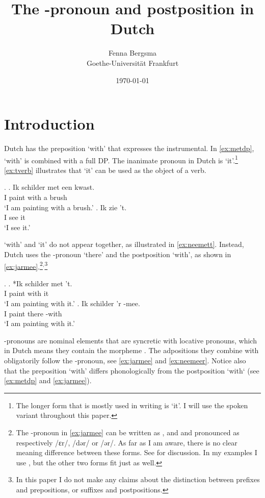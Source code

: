 \documentclass[12pt]{article}
\title{The \tsc{r}-pronoun and postposition \tit{waar-mee} in Dutch}
\author{Fenna Bergsma\\Goethe-Universität Frankfurt}
\date{\today}
\begin{document}
\maketitle


\section{Introduction}

Dutch has the preposition  `with' that expresses the instrumental. In \ref{ex:metdp},  `with' is combined with a full DP. The inanimate pronoun in Dutch is  `it'.\footnote{The longer form that is mostly used in writing is  `it'. I will use the spoken variant  throughout this paper.} \ref{ex:tverb} illustrates that  `it' can be used as the object of a verb.

\ex.
\ag. Ik schilder met een kwast.\\
 I paint with a brush\\
 `I am painting with a brush.'\label{ex:metdp}
 \bg. Ik zie 't.\\
  I see it\\
  `I see it.'\label{ex:tverb}

 `with' and  `it' do not appear together, as illustrated in \ref{ex:neemett}. Instead, Dutch uses the -pronoun  `there' and the postposition  `with', as shown in \ref{ex:jarmee}.\footnote{The -pronoun  in \ref{ex:jarmee} can be written as ,  and  and pronounced as respectively /ɛr/, /dər/ or /ər/. As far as I am aware, there is no clear meaning difference between these forms. See \citet{wesseling2018} for discussion.
In my examples I use , but the other two forms fit just as well.}$^,$\footnote{In this paper I do not make any claims about the distinction between prefixes and prepositions, or suffixes and postpositions.}

\ex.\label{ex:rmeeconst}
\ag. *Ik schilder met 't.\\
 I paint with it\\
 `I am painting with it.'\label{ex:neemett}
\bg. Ik schilder 'r -mee.\\
 I paint there -with\\
 `I am painting with it.'\label{ex:jarmee}

-pronouns \citep{riemsdijk1978,koopman1994} are nominal elements that are syncretic with locative pronouns, which in Dutch means they contain the morpheme . The adpositions they combine with obligatorily follow the -pronoun, see \ref{ex:jarmee} and \ref{ex:neemeer}.
Notice also that the preposition  `with' differs phonologically from the postposition  `with` (see \ref{ex:metdp} and \ref{ex:jarmee}).
\end{document}
